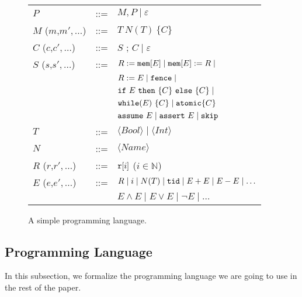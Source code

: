 \begin{figure}
\begin{tabular}{lcl}
$P$ & ::= & $M,P \mid \varepsilon$\\
$M$ ($m$,$m',\ldots$) & ::= & $T\ N(T)\ \{ C \}$\\
$C$ ($c$,$c',\ldots$) & ::= & $S$ ; $C \mid \varepsilon$\\
$S$ ($s$,$s',\ldots$) & ::= & $R := \mathtt{mem}[E] \mid \mathtt{mem}[E] := R \mid$\\
& &  $R := E \mid \mathtt{fence} \mid$\\
& & $\mathtt{if}\ E\ \mathtt{then}\ \{C\}\ \mathtt{else}\ \{C\}\mid$\\ 
& & $\mathtt{while}(E)\ \{C\}\mid \mathtt{atomic}\{C\}$\\
& & $\mathtt{assume}\ E \mid \mathtt{assert}\ E \mid \mathtt{skip}$\\
$T$ & ::= & $\langle Bool\rangle \mid \langle Int\rangle$\\
$N$ & ::= & $\langle Name\rangle$\\
$R$ ($r$,$r',\ldots$) & ::= & $\mathtt{r}[i]$ ($i\in\mathbb{N}$)\\
$E$ ($e$,$e',\ldots$) & ::= & $R \mid i \mid N(T) \mid \mathtt{tid} \mid E+E \mid E-E \mid \ldots$\\
& & $E\wedge E \mid E\vee E \mid \neg E \mid \ldots $
\end{tabular}
\label{fig:program-grammar}
\caption{A simple programming language.}
\end{figure}

\newcommand{\aliprogstmt}{\ensuremath{\mathsf{Stmt}}}
\newcommand{\aliprogstmtx}[1]{\ensuremath{\aliprogstmt (#1)}}

\subsection{Programming Language}
\label{subsec:programming-language}
In this subsection, we formalize the programming language we are going to use in the rest of the paper.

